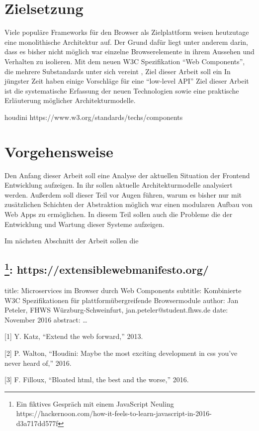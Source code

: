 \section{Zielsetzung}\label{zielsetzung}

Viele populäre Frameworks für den Browser als Zielplattform weisen
heutzutage eine monolithische Architektur auf. Der Grund dafür liegt
unter anderem darin, dass es bisher nicht möglich war einzelne
Browserelemente in ihrem Aussehen und Verhalten zu isolieren. Mit dem
neuen W3C Spezifikation ``Web Components'', die mehrere Substandards
unter sich vereint , Ziel dieser Arbeit soll ein In jüngster Zeit haben
einige Vorschläge für eine ``low-level API'' Ziel dieser Arbeit ist die
systematische Erfassung der neuen Technologien sowie eine praktische
Erläuterung möglicher Architekturmodelle.

houdini https://www.w3.org/standards/techs/components

\section{Vorgehensweise}\label{vorgehensweise}

Den Anfang dieser Arbeit soll eine Analyse der aktuellen Situation der
Frontend Entwicklung aufzeigen. In ihr sollen aktuelle
Architekturmodelle analysiert werden. Außerdem soll dieser Teil vor
Augen führen, warum es bisher nur mit zusätzlichen Schichten der
Abstraktion möglich war einen modularen Aufbau von Web Apps zu
ermöglichen. In diesem Teil sollen auch die Probleme die der Entwicklung
und Wartung dieser Systeme aufzeigen.

Im nächsten Abschnitt der Arbeit sollen die

\subsection[:
https://extensiblewebmanifesto.org/]{\texorpdfstring{\footnote{Ein
  fiktives Gespräch mit einem JavaScript Neuling
  https://hackernoon.com/how-it-feels-to-learn-javascript-in-2016-d3a717dd577f}:
https://extensiblewebmanifesto.org/}{: https://extensiblewebmanifesto.org/}}\label{fn1-httpsextensiblewebmanifesto.org}

title: Microservices im Browser durch Web Components subtitle:
Kombinierte W3C Spezifikationen für plattformübergreifende Browsermodule
author: Jan Peteler, FHWS Würzburg-Schweinfurt,
jan.peteler@student.fhws.de date: November 2016 abstract: \ldots{}

\hypertarget{refs}{}
\hypertarget{ref-Katz2013}{}
{[}1{]} Y. Katz, ``Extend the web forward,'' 2013.

\hypertarget{ref-Walton2016}{}
{[}2{]} P. Walton, ``Houdini: Maybe the most exciting development in css
you've never heard of,'' 2016.

\hypertarget{ref-Filloux2016}{}
{[}3{]} F. Filloux, ``Bloated html, the best and the worse,'' 2016.
